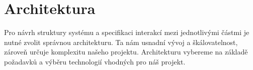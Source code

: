 \section{Architektura}
Pro návrh struktury systému a specifikaci interakcí mezi jednotlivými částmi je nutné zvolit správnou
architekturu. Ta nám usnadní vývoj a škálovatelnost, zároveň určuje komplexitu našeho projektu. 
Architekturu vybereme na základě požadavků a výběru technologií vhodných pro náš projekt.
